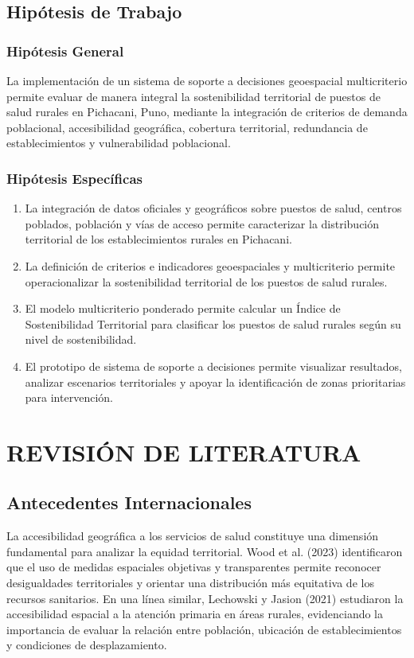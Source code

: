 \documentclass[12pt,a4paper,oneside]{article}
\begin{document}
\subsection{Hipótesis de Trabajo}
\subsubsection{Hipótesis General}
La implementación de un sistema de soporte a decisiones geoespacial multicriterio permite evaluar de manera integral la sostenibilidad territorial de puestos de salud rurales en Pichacani, Puno, mediante la integración de criterios de demanda poblacional, accesibilidad geográfica, cobertura territorial, redundancia de establecimientos y vulnerabilidad poblacional.

\subsubsection{Hipótesis Específicas}
\begin{enumerate}[label={H\arabic*:}]
    \item La integración de datos oficiales y geográficos sobre puestos de salud, centros poblados, población y vías de acceso permite caracterizar la distribución territorial de los establecimientos rurales en Pichacani.
    \item La definición de criterios e indicadores geoespaciales y multicriterio permite operacionalizar la sostenibilidad territorial de los puestos de salud rurales.
    \item El modelo multicriterio ponderado permite calcular un Índice de Sostenibilidad Territorial para clasificar los puestos de salud rurales según su nivel de sostenibilidad.
    \item El prototipo de sistema de soporte a decisiones permite visualizar resultados, analizar escenarios territoriales y apoyar la identificación de zonas prioritarias para intervención.
\end{enumerate}

\newpage

\section{REVISIÓN DE LITERATURA}

\subsection{Antecedentes Internacionales}
La accesibilidad geográfica a los servicios de salud constituye una dimensión fundamental para analizar la equidad territorial. Wood et al. (2023) identificaron que el uso de medidas espaciales objetivas y transparentes permite reconocer desigualdades territoriales y orientar una distribución más equitativa de los recursos sanitarios. En una línea similar, Lechowski y Jasion (2021) estudiaron la accesibilidad espacial a la atención primaria en áreas rurales, evidenciando la importancia de evaluar la relación entre población, ubicación de establecimientos y condiciones de desplazamiento.
\end{document}
